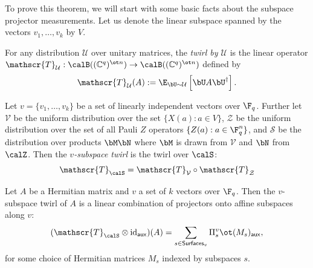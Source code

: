 \documentclass[11pt]{article}
\newcommand{\twirl}{\mathscr{T}}
\newcommand{\reg}[1]{{\mathsf{#1}}}
\newcommand{\surfaces}[1]{\mathsf{Surfaces}_{#1}}
\begin{document}
To prove this theorem,  we will start with some basic facts about the subspace projector
  measurements. Let us denote the linear subspace spanned by the
  vectors $v_1, \dots, v_k$ by $V$.
  
  \begin{definition}
    For any distribution $\mathcal{U}$ over unitary matrices,
    the \emph{twirl by
      $\mathcal{U}$} is the linear operator $\twirl_{\mathcal{U}} :
    \calB((\mathbb{C}^q)^{\ot n}) \to \calB((\mathbb{C}^q)^{\ot n})$
    defined by
    \[ \twirl_{\mathcal{U}}(A) := \E_{\bU \sim \mathcal{U}} \left[ \bU A
        \bU^\dagger \right]. \]
  \end{definition}
  \begin{definition}
    Let $v = \{v_1, \dots, v_k\}$ be a set of linearly independent
    vectors over $\F_q$. Further let $\mathcal{V}$ be the uniform
    distribution over the set $\{X(a): a \in V \}$, $\mathcal{Z}$ be
    the uniform distribution over the set of all Pauli $Z$ operators
    $\{Z(a): a \in \F_q^n\}$, and $\mathcal{S}$ be the distribution
    over products $\bM\bN$ where $\bM$ is drawn from $\mathcal{V}$ and $\bN$
    from $\calZ$. Then the \emph{$v$-subspace twirl} is the
    twirl over $\calS$:
    \[ \twirl_{\calS} = \twirl_{\mathcal{V}} \circ \twirl_{\mathcal{Z}} \]
  \end{definition}
  \begin{proposition}
    \label{prop:hidden-subspace-twirl}
    Let $A$ be a Hermitian matrix and $v$ a set of $k$ vectors over $\F_q$. Then the $v$-subspace twirl of
    $A$ is a linear combination of projectors onto affine subspaces
    along $v$:
    \[ (\twirl_{\calS} \otimes \mathrm{id}_{\reg{aux}})(A) = \sum_{s \in \surfaces{v}}
      \Pi^{v}_{s} \ot (M_s)_{\reg{aux}} , \]
    for some choice of Hermitian matrices $M_s$ indexed by subspaces $s$.
  \end{proposition}
\end{document}
